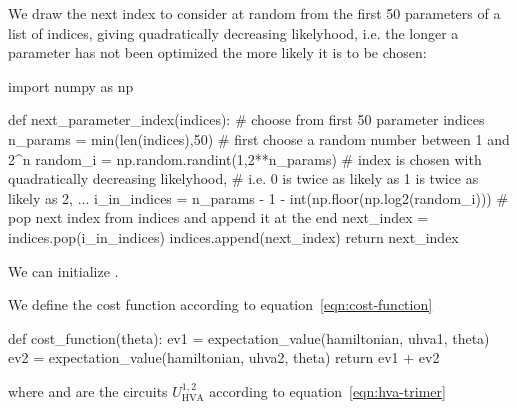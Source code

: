 \documentclass[a4paper,12pt]{article}
\begin{document}
We draw the next index to consider at random from the first 50 parameters of a list of indices, giving quadratically decreasing likelyhood, i.e. the longer a parameter has not been optimized the more likely it is to be chosen:
\begin{python}
import numpy as np

def next_parameter_index(indices):
    # choose from first 50 parameter indices
    n_params = min(len(indices),50)
    # first choose a random number between 1 and 2^n
    random_i = np.random.randint(1,2**n_params)
    # index is chosen with quadratically decreasing likelyhood,
    # i.e. 0 is twice as likely as 1 is twice as likely as 2, ...
    i_in_indices = n_params - 1 - int(np.floor(np.log2(random_i)))
    # pop next index from indices and append it at the end
    next_index = indices.pop(i_in_indices)
    indices.append(next_index)
    return next_index
\end{python}
We can initialize .

We define the cost function according to equation~\eqref{eqn:cost-function}
\begin{python}
def cost_function(theta):
    ev1 = expectation_value(hamiltonian, uhva1, theta)
    ev2 = expectation_value(hamiltonian, uhva2, theta)
    return ev1 + ev2
\end{python}
where  and  are the circuits $U_\text{HVA}^{1,2}$ according to equation~\eqref{eqn:hva-trimer}
\end{document}
